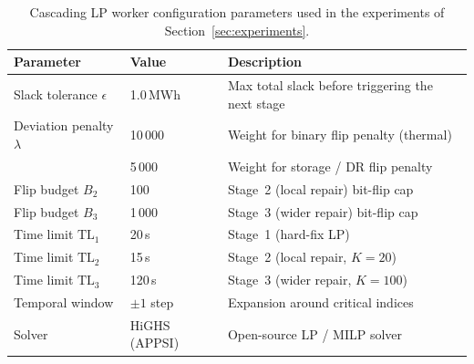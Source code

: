 \documentclass{article}
\begin{document}
\begin{table}[htbp]
\centering
\small
\begin{tabular}{lll}
\toprule
\textbf{Parameter} & \textbf{Value} & \textbf{Description} \\
\midrule
Slack tolerance $\epsilon$ & 1.0\,MWh & Max total slack before triggering the next stage \\
Deviation penalty $\lambda$ & 10\,000 & Weight for binary flip penalty (thermal) \\
 & 5\,000 & Weight for storage / DR flip penalty \\
Flip budget $B_2$ & 100 & Stage~2 (local repair) bit-flip cap \\
Flip budget $B_3$ & 1\,000 & Stage~3 (wider repair) bit-flip cap \\
Time limit $\mathrm{TL}_1$ & 20\,s & Stage~1 (hard-fix LP) \\
Time limit $\mathrm{TL}_2$ & 15\,s & Stage~2 (local repair, $K{=}20$) \\
Time limit $\mathrm{TL}_3$ & 120\,s & Stage~3 (wider repair, $K{=}100$) \\
Temporal window & $\pm 1$ step & Expansion around critical indices \\
Solver & HiGHS (APPSI) & Open-source LP / MILP solver \\
\bottomrule
\end{tabular}
\caption{Cascading LP worker configuration parameters used in the experiments of Section~\ref{sec:experiments}.}
\label{tab:lp_worker_params}
\end{table}
\end{document}
